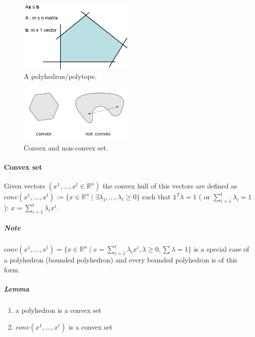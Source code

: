 \documentclass[main]{subfiles}
\begin{document}
\begin{figure}
  \label{fig:polyhedron}
  \caption{A polyhedron/polytope.}
  \centering
    \includegraphics[width=0.5\textwidth]{imgs/polyhedron.png}
\end{figure}

\begin{figure}
  \label{fig:convex-set}
  \caption{Convex and non-convex set.}
  \centering
    \includegraphics[width=0.5\textwidth]{imgs/convex-set.png}
\end{figure}


\paragraph{Convex set}
Given vectors $(x^{1}, \dots, x^{t} \in \mathbb{R}^{n})$ the convex hull of
this vectors are defined as $conv(x^{1}, \dots, x^{t}):= \{ x \in
\mathbb{R}^{n} \mid \exists \lambda_{1}, \dots, \lambda_{t} \geq 0 \}$ such
that $\mathds{1}^{T} \lambda = 1$ ( or $\sum_{i=1}^{t} \lambda_{i} = 1$):
$x = \sum_{i=1}^{t} \lambda_{i} x^{i}$.

\subparagraph{Note}
$conv(x^{1}, \dots, x^{t}) = \{ x \in \mathbb{R}^{n} \mid x = \sum_{i=1}^{t}
\lambda_{i} x^{i}, \lambda \geq 0, \sum \lambda = 1 \}$ is a special case of a
polyhedron (bounded polyhedron) and every bounded polyhedron is of this form.

\subparagraph{Lemma}
\begin{enumerate}
\item \label{item:polyhedron-convex-set} a polyhedron is a convex set
\item \label{item:convex-hull-convex-set} $conv(x^{1}, \dots, x^{t})$ is a
convex set
\end{enumerate}
\end{document}
